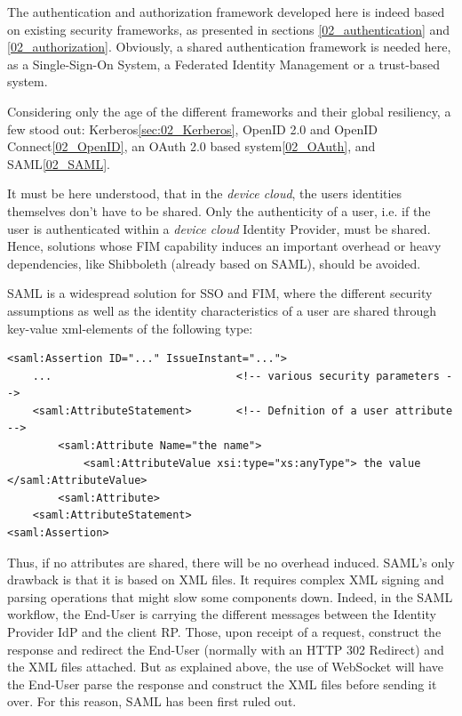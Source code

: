 The authentication and authorization framework developed here is indeed based on existing security frameworks, as presented in sections \ref{02_authentication} and \ref{02_authorization}. Obviously, a shared authentication framework is needed here, as a Single-Sign-On System, a Federated Identity Management or a trust-based system.

Considering only the age of the different frameworks and their global resiliency, a few stood out: Kerberos\ref{sec:02_Kerberos}, OpenID 2.0 and OpenID Connect\ref{02_OpenID}, an OAuth 2.0 based system\ref{02_OAuth}, and SAML\ref{02_SAML}.

It must be here understood, that in the \emph{device cloud}, the users identities themselves don't have to be shared. Only the authenticity of a user, i.e. if the user is authenticated within a \emph{device cloud} Identity Provider, must be shared. Hence, solutions whose FIM capability induces an important overhead or heavy dependencies, like Shibboleth (already based on SAML), should be avoided.

SAML is a widespread solution for SSO and FIM, where the different security assumptions as well as the identity characteristics of a user are shared through key-value xml-elements of the following type:

\begin{minipage}{\linewidth}

\lstset{language=XML}
\begin{lstlisting}
<saml:Assertion ID="..." IssueInstant="...">
	...								<!-- various security parameters -->
	<saml:AttributeStatement>		<!-- Defnition of a user attribute -->
		<saml:Attribute Name="the name">
			<saml:AttributeValue xsi:type="xs:anyType"> the value </saml:AttributeValue>
		<saml:Attribute>
	<saml:AttributeStatement>
<saml:Assertion>
\end{lstlisting}
\end{minipage}

Thus, if no attributes are shared, there will be no overhead induced. SAML's only drawback is that it is based on XML files. It requires complex XML signing and parsing operations that might slow some components down. Indeed, in the SAML workflow, the End-User is carrying the different messages between the Identity Provider IdP and the client RP. Those, upon receipt of a request, construct the response and redirect the End-User (normally with an HTTP 302 Redirect) and the XML files attached. But as explained above, the use of WebSocket will have the End-User parse the response and construct the XML files before sending it over. For this reason, SAML has been first ruled out.

